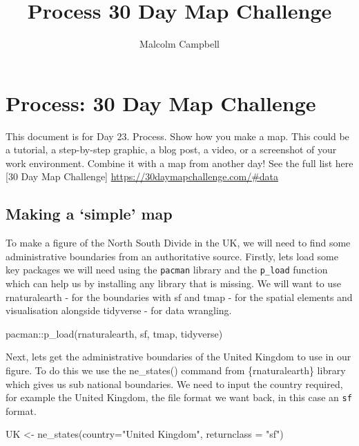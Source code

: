 \documentclass[
  letterpaper,
  DIV=11,
  numbers=noendperiod]{scrartcl}
\title{Process 30 Day Map Challenge}
\author{Malcolm Campbell}
\date{}
\newenvironment{Shaded}{\begin{snugshade}}{\end{snugshade}}
\newcommand{\AttributeTok}[1]{\textcolor[rgb]{0.40,0.45,0.13}{#1}}
\newcommand{\FunctionTok}[1]{\textcolor[rgb]{0.28,0.35,0.67}{#1}}
\newcommand{\NormalTok}[1]{\textcolor[rgb]{0.00,0.23,0.31}{#1}}
\newcommand{\OtherTok}[1]{\textcolor[rgb]{0.00,0.23,0.31}{#1}}
\newcommand{\SpecialCharTok}[1]{\textcolor[rgb]{0.37,0.37,0.37}{#1}}
\newcommand{\StringTok}[1]{\textcolor[rgb]{0.13,0.47,0.30}{#1}}
\begin{document}
\maketitle


\section{Process: 30 Day Map
Challenge}\label{process-30-day-map-challenge}

This document is for Day 23. Process. Show how you make a map. This
could be a tutorial, a step-by-step graphic, a blog post, a video, or a
screenshot of your work environment. Combine it with a map from another
day! See the full list here {[}30 Day Map Challenge{]}
\url{https://30daymapchallenge.com/\#data}

\subsection{Making a `simple' map}\label{making-a-simple-map}

To make a figure of the North South Divide in the UK, we will need to
find some administrative boundaries from an authoritative source.
Firstly, lets load some key packages we will need using the
\texttt{pacman} library and the \texttt{p\_load} function which can help
us by installing any library that is missing. We will want to use
rnaturalearth - for the boundaries with sf and tmap - for the spatial
elements and visualisation alongside tidyverse - for data wrangling.

\begin{Shaded}
\begin{Highlighting}[]
\NormalTok{pacman}\SpecialCharTok{::}\FunctionTok{p\_load}\NormalTok{(rnaturalearth, sf, tmap, tidyverse)}
\end{Highlighting}
\end{Shaded}

Next, lets get the administrative boundaries of the United Kingdom to
use in our figure. To do this we use the ne\_states() command from
\{rnaturalearth\} library which gives us sub national boundaries. We
need to input the country required, for example the United Kingdom, the
file format we want back, in this case an \texttt{sf} format.

\begin{Shaded}
\begin{Highlighting}[]
\NormalTok{UK }\OtherTok{\textless{}{-}} \FunctionTok{ne\_states}\NormalTok{(}\AttributeTok{country=}\StringTok{"United Kingdom"}\NormalTok{, }\AttributeTok{returnclass =} \StringTok{"sf"}\NormalTok{)}
\end{Highlighting}
\end{Shaded}
\end{document}
